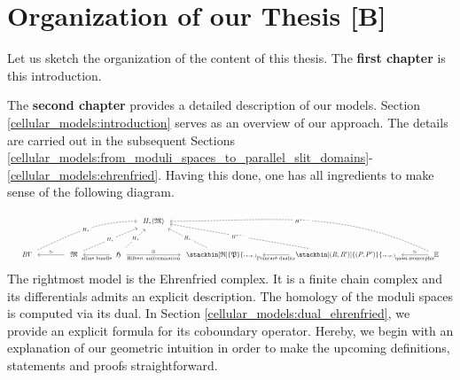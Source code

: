 \section{Organization of our Thesis [B]}

Let us sketch the organization of the content of this thesis. The {\bf first chapter} is this introduction.

The {\bf second chapter} provides a detailed description of our models.
Section \ref{cellular_models:introduction} serves as an overview of our approach.
The details are carried out in the subsequent Sections \ref{cellular_models:from_moduli_spaces_to_parallel_slit_domains}-\ref{cellular_models:ehrenfried}.
Having this done, one has all ingredients to make sense of the following diagram.
\[
    \resizebox{\linewidth}{!}{
        \begin{tikzcd}[row sep=7.5ex, scale=1.3, ampersand replacement=\&]
            \&\&\&\&\&H_\ast(\mathfrak M) \\
            B\Gamma \arrow[<-, shorten <=1ex, shorten >=1ex]{rr}{\simeq} \arrow[dashed, out=25, in=180, shorten <=1ex, shorten >=1ex]{rrrrru}[description]{H_\ast} \&\&
            \mathfrak M \arrow[<-, shorten <=1ex, shorten >=1ex]{rr}[swap]{\text{affine bundle}} \arrow[dashed, shorten <=1ex, shorten >=1ex]{rrru}[description]{H_\ast} \&\&
            \mathfrak H \arrow[shorten <=1ex, shorten >=1ex]{rr}{\cong}[swap]{\text{Hilbert uniformization}} \arrow[dashed, shorten <=1ex, shorten >=1ex]{ru}[description]{H_\ast} \&\&
            \stackbin[\mathfrak R]{\mathfrak P}{\scriptscriptstyle{resp.}} \arrow[<-, shorten <=1ex, shorten >=1ex]{rr}[swap]{\text{Poincaré duality}} \arrow[dashed, shorten <=1ex, shorten >=1ex]{lu}[description]{H_\ast} \&\&
            \stackbin[(R,R')]{(P,P')}{\scriptscriptstyle{resp.}} \arrow[<-, shorten <=1ex, shorten >=1ex]{rr}{\simeq}[swap]{\text{quasi-isomorphic}} \arrow[dashed, shorten <=1ex, shorten >=1ex]{lllu}[description]{H^{\ast-\ldots}} \&\&
            \E \arrow[dashed, out=155, in=0, shorten <=1ex, shorten >=1ex]{lllllu}[description]{H^{\ast-\ldots}}
        \end{tikzcd}
    }
\]
The rightmost model is the Ehrenfried complex.
It is a finite chain complex and its differentials admits an explicit description.
The homology of the moduli spaces is computed via its dual.
In Section \ref{cellular_models:dual_ehrenfried}, we provide an explicit formula for its coboundary operator.
Hereby, we begin with an explanation of our geometric intuition in order to make the upcoming definitions, statements and proofs straightforward.

